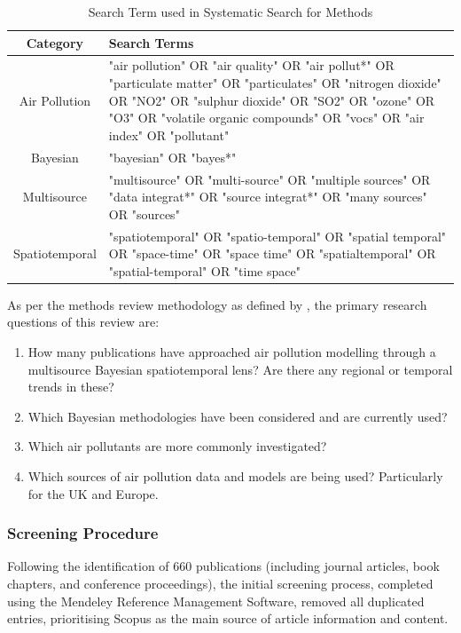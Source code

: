 \begin{table}[h!]
\centering
\begin{tabular}{c p{11cm}} 
 Category & Search Terms \\ [0.5ex] 
 \hline
  Air Pollution & "air pollution" OR "air quality" OR "air pollut*" OR "particulate matter" OR "particulates" OR "nitrogen dioxide" OR "NO2" OR "sulphur dioxide" OR "SO2" OR "ozone" OR "O3" OR "volatile organic compounds" OR "vocs" OR "air index" OR "pollutant" \\ 
  Bayesian & "bayesian" OR "bayes*" \\
  Multisource & "multisource" OR "multi-source" OR "multiple sources" OR "data integrat*" OR "source integrat*" OR "many sources" OR "sources" \\ 
  Spatiotemporal & "spatiotemporal" OR "spatio-temporal" OR "spatial temporal" OR "space-time" OR "space time" OR "spatialtemporal" OR "spatial-temporal" OR "time space" \\ [0.5ex]
 \hline
\end{tabular}
\caption{Search Term used in Systematic Search for Methods}
\label{table:Search terms}
\end{table}

As per the methods review methodology as defined by \cite{Grant2009AMethodologies}, the primary research questions of this review are:

\begin{enumerate}
    \item How many publications have approached air pollution modelling through a multisource Bayesian spatiotemporal lens? Are there any regional or temporal trends in these?
    \item Which Bayesian methodologies have been considered and are currently used? 
    \item Which air pollutants are more commonly investigated? 
    \item Which sources of air pollution data and models are being used? Particularly for the UK and Europe.
\end{enumerate}

\subsubsection{Screening Procedure}
Following the identification of 660 publications (including journal articles, book chapters, and conference proceedings), the initial screening process, completed using the Mendeley Reference Management Software, removed all duplicated entries, prioritising Scopus as the main source of article information and content.

